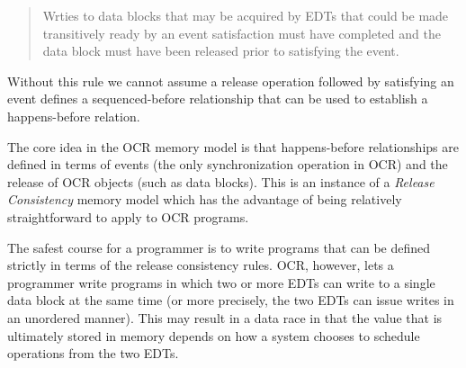 %
%
%
%
%

\begin{quote}
Wrties to data blocks that may be acquired by EDTs that could be made
transitively ready by an event satisfaction must have completed and
the data block must have been released prior to satisfying the event.
\end{quote}

Without this rule we cannot assume a release operation followed by
satisfying an event defines a sequenced-before relationship that can
be used to establish a happens-before relation.

The core idea in the OCR memory model is that happens-before
relationships are defined in terms of events (the only synchronization
operation in OCR) and the release of OCR objects (such as data
blocks). This is an instance of a \emph{Release
Consistency} memory model which has the
advantage of being relatively straightforward to apply to OCR
programs.

The safest course for a programmer is to write programs that can be
defined strictly in terms of the release consistency rules. OCR,
however, lets a programmer write programs in which two or more EDTs can
write to a single data block at the same time (or more precisely, the
two EDTs can issue writes in an unordered manner). This may result in a
data race in that the value that is ultimately stored
in memory depends on how a system chooses to schedule operations from
the two EDTs.

